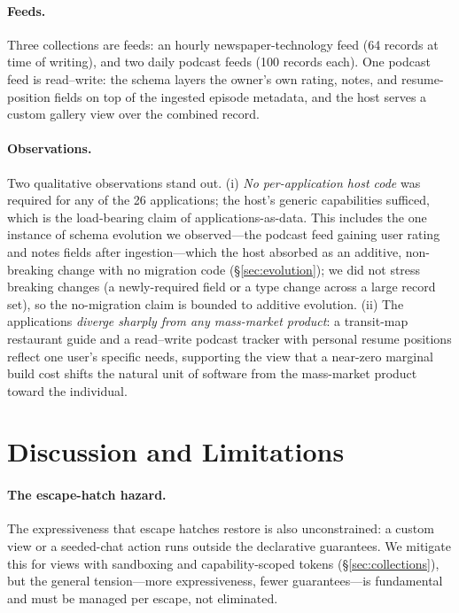 \documentclass[11pt]{article}
\begin{document}
\paragraph{Feeds.}
Three collections are feeds: an hourly newspaper-technology feed (64 records at
time of writing), and two daily podcast feeds (100 records each). One podcast feed
is read--write: the schema layers the owner's own rating, notes, and
resume-position fields on top of the ingested episode metadata, and the host
serves a custom gallery view over the combined record.

\paragraph{Observations.}
Two qualitative observations stand out. (i) \emph{No per-application host code} was
required for any of the 26 applications; the host's generic capabilities sufficed,
which is the load-bearing claim of applications-as-data. This includes the one
instance of schema evolution we observed---the podcast feed gaining user rating and
notes fields after ingestion---which the host absorbed as an additive,
non-breaking change with no migration code (\S\ref{sec:evolution}); we did not
stress breaking changes (a newly-required field or a type change across a large
record set), so the no-migration claim is bounded to additive evolution. (ii) The applications
\emph{diverge sharply from any mass-market product}: a transit-map restaurant
guide and a read--write podcast tracker with personal resume positions reflect one
user's specific needs, supporting the view that a near-zero marginal build cost
shifts the natural unit of software from the mass-market product toward the
individual.

\section{Discussion and Limitations}
\label{sec:limitations}

\paragraph{The escape-hatch hazard.}
The expressiveness that escape hatches restore is also unconstrained: a custom
view or a seeded-chat action runs outside the declarative guarantees. We mitigate
this for views with sandboxing and capability-scoped tokens (\S\ref{sec:collections}),
but the general tension---more expressiveness, fewer guarantees---is fundamental
and must be managed per escape, not eliminated.
\end{document}
